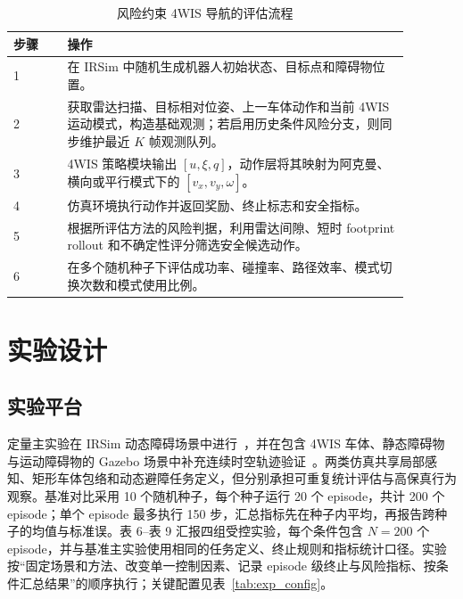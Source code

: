 \documentclass[UTF8,10pt,a4paper,twocolumn]{ctexart}
\begin{document}
\begin{table}[H]
    \centering

    \caption{风险约束 4WIS 导航的评估流程}
    \label{tab:algorithm}
    \small
    \begin{tabular}
{p{0.12\linewidth}p{0.76\linewidth}}
        \toprule

        步骤 & 操作 \\
        \midrule

        1 & 在 IRSim 中随机生成机器人初始状态、目标点和障碍物位置。 \\
        2 & 获取雷达扫描、目标相对位姿、上一车体动作和当前 4WIS 运动模式，构造基础观测；若启用历史条件风险分支，则同步维护最近 $K$ 帧观测队列。 \\
        3 & 4WIS 策略模块输出 $[u,\xi,q]$，动作层将其映射为阿克曼、横向或平行模式下的 $[v_x,v_y,\omega]$。 \\
        4 & 仿真环境执行动作并返回奖励、终止标志和安全指标。 \\
        5 & 根据所评估方法的风险判据，利用雷达间隙、短时 footprint rollout 和不确定性评分筛选安全候选动作。 \\
        6 & 在多个随机种子下评估成功率、碰撞率、路径效率、模式切换次数和模式使用比例。 \\
        \bottomrule

    
\end{tabular}
\end{table}

\section{实验设计}

\subsection{实验平台}

定量主实验在 IRSim 动态障碍场景中进行~\cite{irsim}，并在包含 4WIS 车体、静态障碍物与运动障碍物的 Gazebo 场景中补充连续时空轨迹验证~\cite{koenig2004gazebo}。两类仿真共享局部感知、矩形车体包络和动态避障任务定义，但分别承担可重复统计评估与高保真行为观察。基准对比采用 10 个随机种子，每个种子运行 20 个 episode，共计 200 个 episode；单个 episode 最多执行 150 步，汇总指标先在种子内平均，再报告跨种子的均值与标准误。表 6--表 9 汇报四组受控实验，每个条件包含 $N=200$ 个 episode，并与基准主实验使用相同的任务定义、终止规则和指标统计口径。实验按“固定场景和方法、改变单一控制因素、记录 episode 级终止与风险指标、按条件汇总结果”的顺序执行；关键配置见表~\ref{tab:exp_config}。
\end{document}
